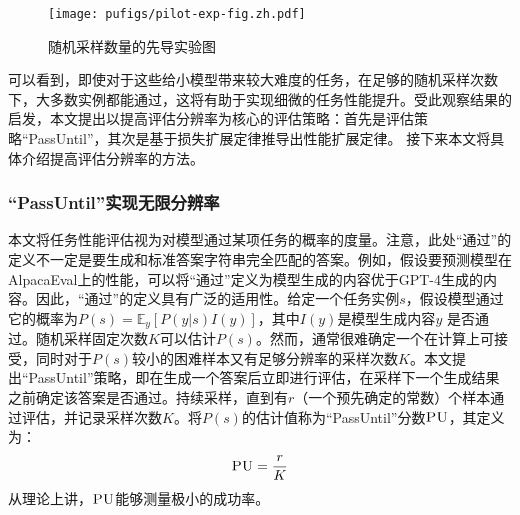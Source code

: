 \begin{figure}[htbp]
\centering
    \texttt{[image: pufigs/pilot-exp-fig.zh.pdf]}
    \caption{随机采样数量的先导实验图}
    \label{tab:opensourcemodel_rs}
\end{figure}

可以看到，即使对于这些给小模型带来较大难度的任务，在足够的随机采样次数下，大多数实例都能通过，这将有助于实现细微的任务性能提升。受此观察结果的启发，本文提出以提高评估分辨率为核心的评估策略：首先是评估策略“PassUntil”，其次是基于损失扩展定律推导出性能扩展定律。 接下来本文将具体介绍提高评估分辨率的方法。

\subsubsection{“PassUntil”实现无限分辨率}
本文将任务性能评估视为对模型通过某项任务的概率的度量。注意，此处“通过”的定义不一定是要生成和标准答案字符串完全匹配的答案。例如，假设要预测模型在AlpacaEval\citep{alpaca_eval}上的性能，可以将“通过”定义为模型生成的内容优于GPT-4生成的内容。因此，“通过”的定义具有广泛的适用性。给定一个任务实例$s$，假设模型通过它的概率为$P(s) = \mathbb{E}_y[P(y|s)I(y)]$，其中$I(y)$是模型生成内容$y$ 是否通过。随机采样固定次数$K$可以估计$P(s)$。然而，通常很难确定一个在计算上可接受，同时对于$P(s)$较小的困难样本又有足够分辨率的采样次数$K$。本文提出“PassUntil”策略，即在生成一个答案后立即进行评估，在采样下一个生成结果之前确定该答案是否通过。持续采样，直到有$r$（一个预先确定的常数）个样本通过评估，并记录采样次数$K$。将$P(s)$的估计值称为“PassUntil”分数$\textsc{PU}$，其定义为：
\begin{equation}
\label{equ:pudef}
    \textsc{PU} = \frac{r}{K}
\end{equation}
从理论上讲，$\textsc{PU}$能够测量极小的成功率。

